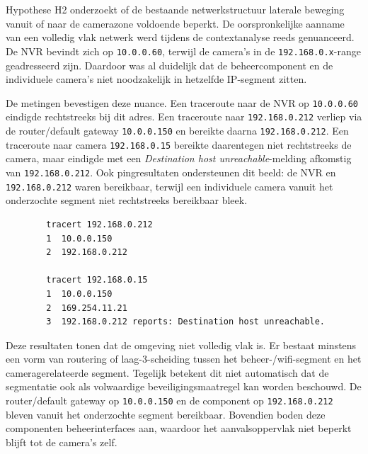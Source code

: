 \section{}%
\label{sec:h2-segmentatie}

Hypothese H2 onderzoekt of de bestaande netwerkstructuur laterale beweging vanuit of naar de camerazone voldoende beperkt. De oorspronkelijke aanname van een volledig vlak netwerk werd tijdens de contextanalyse reeds genuanceerd. De NVR bevindt zich op \texttt{10.0.0.60}, terwijl de camera's in de \texttt{192.168.0.x}-range geadresseerd zijn. Daardoor was al duidelijk dat de beheercomponent en de individuele camera's niet noodzakelijk in hetzelfde IP-segment zitten.

De metingen bevestigen deze nuance. Een traceroute naar de NVR op \texttt{10.0.0.60} eindigde rechtstreeks bij dit adres. Een traceroute naar \texttt{192.168.0.212} verliep via de router/default gateway \texttt{10.0.0.150} en bereikte daarna \texttt{192.168.0.212}. Een traceroute naar camera \texttt{192.168.0.15} bereikte daarentegen niet rechtstreeks de camera, maar eindigde met een \textit{Destination host unreachable}-melding afkomstig van \texttt{192.168.0.212}. Ook pingresultaten ondersteunen dit beeld: de NVR en \texttt{192.168.0.212} waren bereikbaar, terwijl een individuele camera vanuit het onderzochte segment niet rechtstreeks bereikbaar bleek.

{\small
    \begin{verbatim}
        tracert 192.168.0.212
        1  10.0.0.150
        2  192.168.0.212
        
        tracert 192.168.0.15
        1  10.0.0.150
        2  169.254.11.21
        3  192.168.0.212 reports: Destination host unreachable.
    \end{verbatim}
}

Deze resultaten tonen dat de omgeving niet volledig vlak is. Er bestaat minstens een vorm van routering of laag-3-scheiding tussen het beheer-/wifi-segment en het cameragerelateerde segment. Tegelijk betekent dit niet automatisch dat de segmentatie ook als volwaardige beveiligingsmaatregel kan worden beschouwd. De router/default gateway op \texttt{10.0.0.150} en de component op \texttt{192.168.0.212} bleven vanuit het onderzochte segment bereikbaar. Bovendien boden deze componenten beheerinterfaces aan, waardoor het aanvalsoppervlak niet beperkt blijft tot de camera's zelf.

